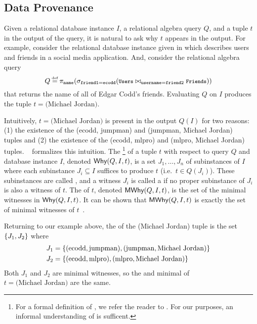 \subsection{Data Provenance}
Given a relational database instance $I$, a relational algebra query $Q$, and a
tuple $t$ in the output of the query, it is natural to ask why $t$ appears in
the output. For example, consider the relational database instance given in
 which describes users and friends in a social media
application.  And, consider the relational algebra query
\[
  \footnotesize
  Q \defeq \pi_{\ttt{name}}(
             \sigma_{\ttt{friend1} = \ttt{ecodd}}(
                \ttt{Users} \join_{\ttt{username} = \ttt{friend2}} \ttt{Friends}
             )
           )
\]
that returns the name of all of Edgar Codd's friends. Evaluating $Q$ on $I$
produces the tuple $t = \text{(Michael Jordan)}$.

{}

Intuitively, $t = \text{(Michael Jordan)}$ is present in the output $Q(I)$ for
two reasons: (1) the existence of the (ecodd, jumpman) and (jumpman, Michael
Jordan) tuples and (2) the existence of the (ecodd, mlpro) and (mlpro, Michael
Jordan) tuples.  ~\cite{buneman2001and,
cheney2009provenance} formalizes this intuition. The
\whyprovenance{}\footnote{
  For a formal definition of \whyprovenance{}, we refer the reader to
  \cite{cheney2009provenance}. For our purposes, an informal understanding of
  \whyprovenance{} is sufficent.
}
of a tuple $t$ with respect to query $Q$ and database instance $I$, denoted
$\textsf{Why}(Q, I, t)$, is a set $J_1, \ldots, J_n$ of subinstances of $I$ where each
subinstance $J_i \subseteq I$ suffices to produce $t$ (i.e.\ $t \in Q(J_i)$).
These subinstances are called , and a witness $J_i$
is called a  if no proper subinstance of $J_i$
is also a witness of $t$. The  of $t$,
denoted $\textsf{MWhy}(Q, I, t)$, is the set of the minimal witnesses in $\textsf{Why}(Q, I,
t)$. It can be shown that $\textsf{MWhy}(Q, I, t)$ is exactly the set of minimal
witnesses of $t$~\cite{cheney2009provenance}.

Returning to our example above, the \whyprovenance{} of the (Michael Jordan)
tuple is the set $\{J_1, J_2\}$ where
\begin{align*}
  J_1 &= \{(\text{ecodd}, \text{jumpman}), (\text{jumpman}, \text{Michael Jordan})\} \\
  J_2 &= \{(\text{ecodd}, \text{mlpro}), (\text{mlpro}, \text{Michael Jordan})\}
\end{align*}
Both $J_1$ and $J_2$ are minimal witnesses, so the \whyprovenance{} and minimal
\whyprovenance{} of $t = \text{(Michael Jordan)}$ are the same.

